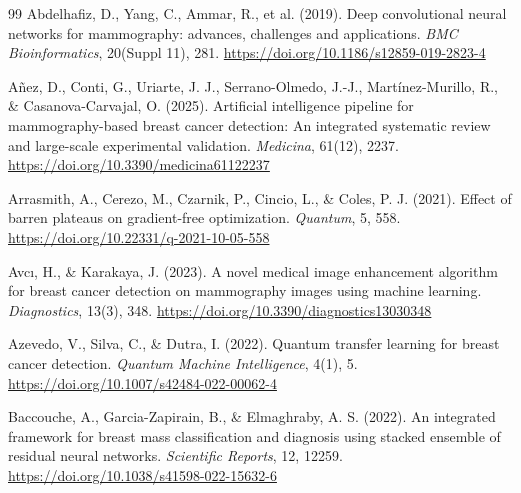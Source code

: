 \begin{thebibliography}{99}
    Abdelhafiz, D., Yang, C., Ammar, R., et al. (2019). Deep convolutional neural networks for mammography:
    advances, challenges and applications. \textit{BMC Bioinformatics}, 20(Suppl 11), 281.
    \url{https://doi.org/10.1186/s12859-019-2823-4}


    Añez, D., Conti, G., Uriarte, J. J., Serrano-Olmedo, J.-J., Martínez-Murillo, R., \& Casanova-Carvajal, O. (2025).
    Artificial intelligence pipeline for mammography-based breast cancer detection: An integrated systematic review and
    large-scale experimental validation. \textit{Medicina}, 61(12), 2237.
    \url{https://doi.org/10.3390/medicina61122237}


    Arrasmith, A., Cerezo, M., Czarnik, P., Cincio, L., \& Coles, P. J. (2021).
    Effect of barren plateaus on gradient-free optimization.
    \textit{Quantum}, 5, 558.
    \url{https://doi.org/10.22331/q-2021-10-05-558}

    Avcı, H., \& Karakaya, J. (2023). A novel medical image enhancement algorithm for breast cancer
    detection on mammography images using machine learning. \textit{Diagnostics}, 13(3), 348.
    \url{https://doi.org/10.3390/diagnostics13030348}


    Azevedo, V., Silva, C., \& Dutra, I. (2022). Quantum transfer learning for breast
    cancer detection. \textit{Quantum Machine Intelligence}, 4(1), 5.
    \url{https://doi.org/10.1007/s42484-022-00062-4}


    Baccouche, A., Garcia-Zapirain, B., \& Elmaghraby, A. S. (2022). An integrated framework for breast mass
    classification and diagnosis using stacked ensemble of residual neural networks. \textit{Scientific Reports}, 12, 12259.
    \url{https://doi.org/10.1038/s41598-022-15632-6}


\end{thebibliography}
